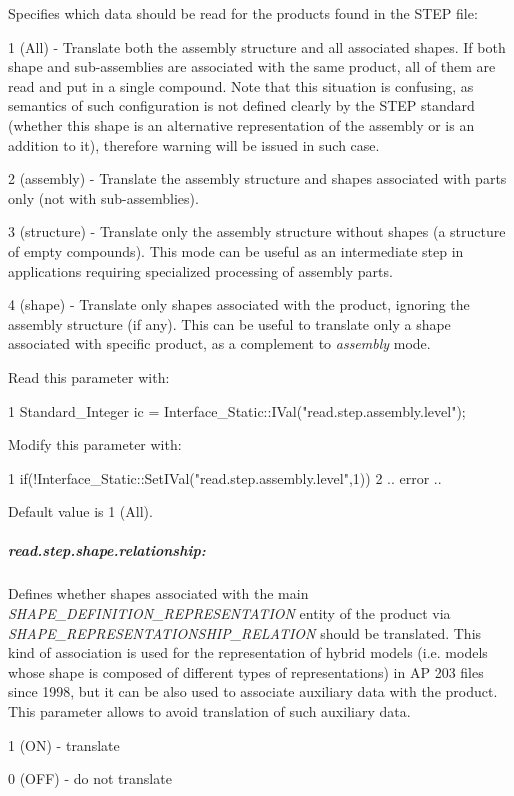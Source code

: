 Specifies which data should be read for the products found in the S\+T\+EP file\+:
\begin{DoxyItemize}
\item 1 (All) -\/ Translate both the assembly structure and all associated shapes. If both shape and sub-\/assemblies are associated with the same product, all of them are read and put in a single compound. Note that this situation is confusing, as semantics of such configuration is not defined clearly by the S\+T\+EP standard (whether this shape is an alternative representation of the assembly or is an addition to it), therefore warning will be issued in such case.
\item 2 (assembly) -\/ Translate the assembly structure and shapes associated with parts only (not with sub-\/assemblies).
\item 3 (structure) -\/ Translate only the assembly structure without shapes (a structure of empty compounds). This mode can be useful as an intermediate step in applications requiring specialized processing of assembly parts.
\item 4 (shape) -\/ Translate only shapes associated with the product, ignoring the assembly structure (if any). This can be useful to translate only a shape associated with specific product, as a complement to {\itshape assembly} mode.
\end{DoxyItemize}

Read this parameter with\+: 
\begin{DoxyCode}
1 Standard\_Integer ic =                   Interface\_Static::IVal("read.step.assembly.level"); 
\end{DoxyCode}
 Modify this parameter with\+: 
\begin{DoxyCode}
1 if(!Interface\_Static::SetIVal("read.step.assembly.level",1))  
2 .. error .. 
\end{DoxyCode}


Default value is 1 (All).

\subparagraph*{read.\+step.\+shape.\+relationship\+:}

Defines whether shapes associated with the main {\itshape S\+H\+A\+P\+E\+\_\+\+D\+E\+F\+I\+N\+I\+T\+I\+O\+N\+\_\+\+R\+E\+P\+R\+E\+S\+E\+N\+T\+A\+T\+I\+ON} entity of the product via {\itshape S\+H\+A\+P\+E\+\_\+\+R\+E\+P\+R\+E\+S\+E\+N\+T\+A\+T\+I\+O\+N\+S\+H\+I\+P\+\_\+\+R\+E\+L\+A\+T\+I\+ON} should be translated. This kind of association is used for the representation of hybrid models (i.\+e. models whose shape is composed of different types of representations) in AP 203 files since 1998, but it can be also used to associate auxiliary data with the product. This parameter allows to avoid translation of such auxiliary data.
\begin{DoxyItemize}
\item 1 (ON) -\/ translate
\item 0 (O\+FF) -\/ do not translate
\end{DoxyItemize}

